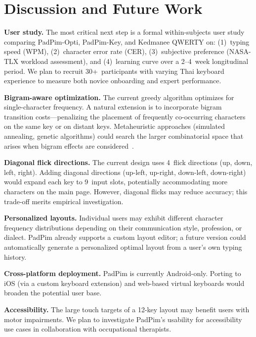 \documentclass[10pt,twocolumn,a4paper]{article}
\begin{document}
\section{Discussion and Future Work}
\label{sec:future}

\textbf{User study.}
The most critical next step is a formal within-subjects user study comparing PadPim-Opti, PadPim-Key, and Kedmanee QWERTY on:
(1)~typing speed (WPM),
(2)~character error rate (CER),
(3)~subjective preference (NASA-TLX workload assessment), and
(4)~learning curve over a 2--4~week longitudinal period.
We plan to recruit 30+~participants with varying Thai keyboard experience to measure both novice onboarding and expert performance.

\textbf{Bigram-aware optimization.}
The current greedy algorithm optimizes for single-character frequency.
A natural extension is to incorporate bigram transition costs---penalizing the placement of frequently co-occurring characters on the same key or on distant keys.
Metaheuristic approaches (simulated annealing, genetic algorithms) could search the larger combinatorial space that arises when bigram effects are considered~\cite{zhai2002,dunlop2012}.

\textbf{Diagonal flick directions.}
The current design uses 4~flick directions (up, down, left, right).
Adding diagonal directions (up-left, up-right, down-left, down-right) would expand each key to 9~input slots, potentially accommodating more characters on the main page.
However, diagonal flicks may reduce accuracy; this trade-off merits empirical investigation.

\textbf{Personalized layouts.}
Individual users may exhibit different character frequency distributions depending on their communication style, profession, or dialect.
PadPim already supports a custom layout editor; a future version could automatically generate a personalized optimal layout from a user's own typing history.

\textbf{Cross-platform deployment.}
PadPim is currently Android-only.
Porting to iOS (via a custom keyboard extension) and web-based virtual keyboards would broaden the potential user base.

\textbf{Accessibility.}
The large touch targets of a 12-key layout may benefit users with motor impairments.
We plan to investigate PadPim's usability for accessibility use cases in collaboration with occupational therapists.
\end{document}
